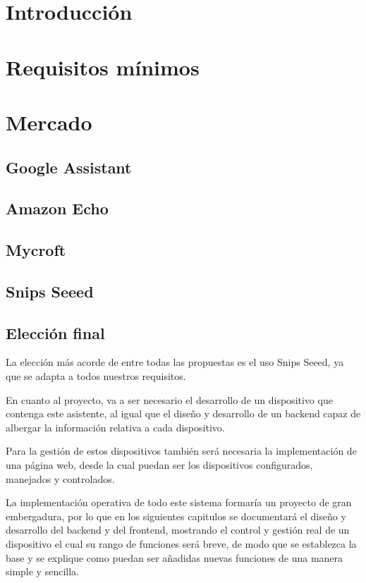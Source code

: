\section{Introducción}


\section{Requisitos mínimos}


\section{Mercado}


    \subsection{Google Assistant}
    
    
    \subsection{Amazon Echo}
    
    
    \subsection{Mycroft}\label{Microft}
    
    
    \subsection{Snips Seeed}
    
    
    \subsection{Elección final}

La elección más acorde de entre todas las propuestas es el uso Snips Seeed, ya que se adapta a todos nuestros requisitos.

En cuanto al proyecto, va a ser necesario el desarrollo de un dispositivo que contenga este asistente, al igual que el diseño y desarrollo de un backend capaz de albergar la información relativa a cada dispositivo.

Para la gestión de estos dispositivos también será necesaria la implementación de una página web, desde la cual puedan ser los dispositivos configurados, manejados y controlados.

La implementación operativa de todo este sistema formaría un proyecto de gran embergadura, por lo que en los siguientes capitulos se documentará el diseño y desarrollo del backend y del frontend, mostrando el control y gestión real de un dispositivo el cual su rango de funciones será breve, de modo que se establezca la base y se explique como puedan ser añadidas nuevas funciones de una manera simple y sencilla.
